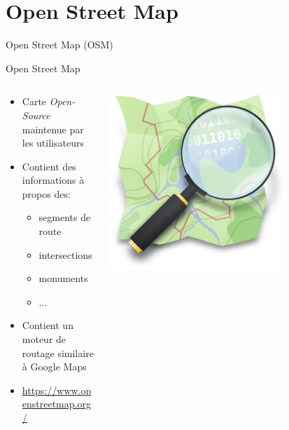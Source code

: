 \documentclass[aspectratio=169]{beamer}
\begin{document}
\section{Open Street Map}
\begin{frame}{Open Street Map (OSM) \cite{haklay2008openstreetmap}}

\begin{center}
{\LARGE Open Street Map}
\end{center}

\begin{columns}
\begin{column}{0.5\textwidth}
	
	\begin{itemize}
		\item Carte \textit{Open-Source} maintenue par les utilisateurs
		\item Contient des informations à propos des:
		\begin{itemize}
			\item segments de route
			\item intersections
			\item monuments
			\item ...
		\end{itemize}
		\item Contient un moteur de routage similaire à Google Maps 
		\item \url{https://www.openstreetmap.org/}
	\end{itemize}
\end{column}
\begin{column}{0.5\textwidth}  %
    \begin{center}
     \includegraphics[width=0.7\textwidth]{figures/osm_logo.png}
     \end{center}
\end{column}
\end{columns}
\end{frame}
\end{document}
